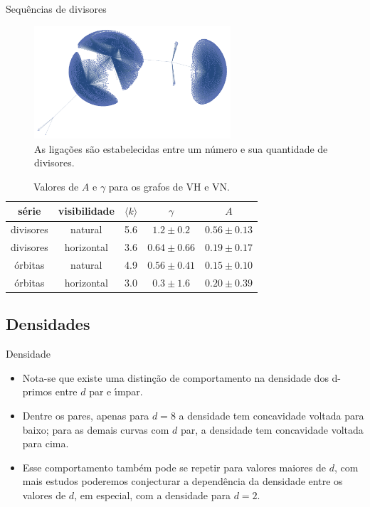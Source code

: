 \documentclass[12pt,
aspectratio=169,
]{beamer}
\begin{document}
\begin{frame}{Sequ\^encias de divisores}
\begin{figure}[H]
    \includegraphics[width=0.65\textwidth]{images/orbits.pdf}
    \centering
    \caption{\centering As ligações são estabelecidas entre um número
    e sua quantidade de divisores.}
    \label{graph-divs}
\end{figure}
\end{frame}


\begin{nobarframe}
    
\begin{table}[H]
    \caption{\centering Valores de $A$ e $\gamma$ para os grafos de VH e VN.}
    \begin{tabular}{|c|c|c|c|c|}
        \hline série & visibilidade & $\langle k \rangle$ & $\gamma$ & $A$ \\
        \hline
        divisores & natural & 5.6 & $1.2 \pm 0.2$ & $0.56 \pm 0.13$ \\
        divisores & horizontal & 3.6 & $0.64 \pm 0.66$ & $0.19 \pm 0.17$ \\
        órbitas & natural & 4.9 & $0.56 \pm 0.41$ & $0.15 \pm 0.10$ \\
        órbitas & horizontal & 3.0 & $0.3 \pm 1.6$ & $0.20 \pm 0.39$ \\
         \hline 
    \end{tabular}
    \label{tab:div-orb}
\end{table}

\end{nobarframe}
\subsection{Densidades}
\begin{frame}{Densidade}
\begin{itemize}
    \item Nota-se que existe uma distin\c c\~ao de comportamento na densidade dos d-primos entre $d$ par e \'\i mpar.
    \item  Dentre os pares, apenas para $d = 8$ a densidade tem concavidade voltada para baixo; para as demais curvas com $d$ par, a densidade tem concavidade voltada para cima.
    \item Esse comportamento tamb\'em pode se repetir para valores maiores de $d$, com mais estudos poderemos conjecturar a depend\^encia da densidade entre os valores de $d$, em especial, com a densidade para $d = 2$.
\end{itemize}
\end{frame}
\end{document}
